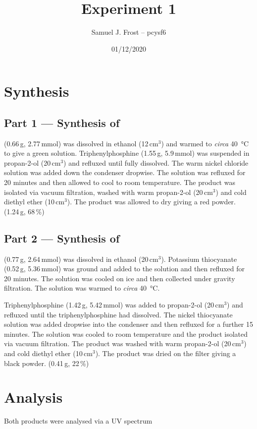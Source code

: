 \documentclass{article}
\title{Experiment 1}
\date{01/12/2020}
\author{Samuel J. Frost -- pcysf6}
\newcommand{\cc}{$\,\text{cm}^{3}$}
\newcommand{\circa}{\emph{circa }}
\newcommand{\g}{\,g}
\begin{document}
\maketitle

\section*{Synthesis}
\subsection*{Part 1 --- Synthesis of }
 (0.66\g, 2.77\,mmol) was dissolved in ethanol (12\cc) and warmed to \circa \SI{40}{\celsius} to give a green solution.
Triphenylphosphine (1.55\g, 5.9\,mmol) was suspended in propan-2-ol (20\cc) and refluxed until fully dissolved.
The warm nickel chloride solution was added down the condenser dropwise. The solution was refluxed for 
20 minutes and then allowed to cool to room temperature. The product was isolated via vacuum filtration,
washed with warm propan-2-ol (20\cc) and cold diethyl ether (10\cc). The product was allowed to dry giving a red powder.
 (1.24\g, 68\,\%)

\subsection*{Part 2 --- Synthesis of }
 (0.77\g, 2.64\,mmol) was dissolved in ethanol (20\cc). Potassium thiocyanate (0.52\g, 5.36\,mmol)
was ground and added to the solution and then refluxed for 20 minutes. The solution was cooled on ice and 
then collected under gravity filtration. The solution was warmed to \circa \SI{40}{\celsius}.

Triphenylphosphine (1.42\g, 5.42\,mmol) was added to propan-2-ol (20\cc) and refluxed until the
triphenylphosphine had dissolved. The nickel thiocyanate solution was added dropwise into the condenser and then
refluxed for a further 15 minutes. The solution was cooled to room temperature and the product isolated via vacuum filtration.
The product was washed with warm propan-2-ol (20\cc) and cold diethyl ether (10\cc). The product was dried on the 
filter giving a black powder. (0.41\g, 22\,\%)

\newpage
\section*{Analysis}
Both products were analysed via a UV spectrum 
\end{document}
